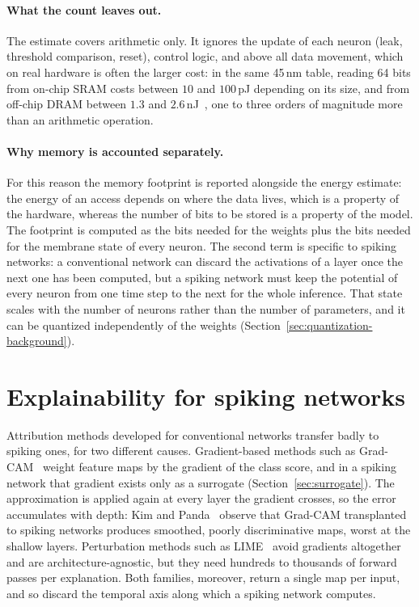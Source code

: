 \paragraph{What the count leaves out.} The estimate covers arithmetic only. It
ignores the update of each neuron (leak, threshold comparison, reset), control
logic, and above all data movement, which on real hardware is often the larger
cost: in the same 45\,nm table, reading 64 bits from on-chip SRAM costs between
$10$ and $100$\,pJ depending on its size, and from off-chip DRAM between $1.3$
and $2.6$\,nJ~\cite{horowitz2014}, one to three orders of magnitude more than an
arithmetic operation.

\paragraph{Why memory is accounted separately.} For this reason the memory
footprint is reported alongside the energy estimate:
the energy of an access depends on where the data lives, which is a property of
the hardware, whereas the number of bits to be stored is a property of the
model. The footprint is computed as the bits needed for the weights plus the
bits needed for the membrane state of every neuron. The second term is specific
to spiking networks: a conventional network can discard the activations of a
layer once the next one has been computed, but a spiking network must keep the
potential of every neuron from one time step to the next for the whole
inference. That state scales with the number of neurons rather than the number
of parameters, and it can be quantized independently of the weights
(Section~\ref{sec:quantization-background}).

\section{Explainability for spiking networks}
\label{sec:sam-background}

Attribution methods developed for conventional networks transfer badly to
spiking ones, for two different causes. Gradient-based methods such as
Grad-CAM~\cite{selvaraju2017gradcam} weight feature maps by the gradient of the
class score, and in a spiking network that gradient exists only as a surrogate
(Section~\ref{sec:surrogate}). The approximation is applied again at every layer
the gradient crosses, so the error accumulates with depth: Kim and
Panda~\cite{kim2021sam} observe that Grad-CAM transplanted to spiking networks
produces smoothed, poorly discriminative maps, worst at the shallow layers.
Perturbation methods such as LIME~\cite{ribeiro2016lime} avoid gradients
altogether and are architecture-agnostic, but they need hundreds to thousands of
forward passes per explanation. Both families, moreover, return a single map per input,
and so discard the temporal axis along which a spiking network computes.

